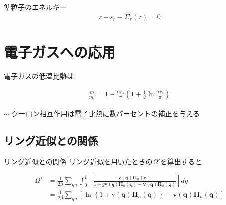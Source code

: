\documentclass[dvipdfmx,10pt]{beamer}
\begin{document}
\begin{frame}
    \begin{block}{準粒子のエネルギー}
        \begin{align*}
            z - \varepsilon_r - \Sigma_r(z)= 0 \tag{51a}
        \end{align*}
    \end{block}
\end{frame}

\section{電子ガスへの応用}
\begin{frame}
    電子ガスの低温比熱は
    \begin{block}{}
        \begin{align*}
            \frac{m}{m_t} = 1 - \frac{\alpha r_s}{\pi}\left(1 + \frac{1}{2}\ln{\frac{\alpha r_s}{\pi}}\right) \tag{67}
        \end{align*}
    \end{block}
    $\cdots$ クーロン相互作用は電子比熱に数パーセントの補正を与える
\end{frame}

\subsection{リング近似との関係}
\begin{frame}{リング近似との関係}
    リング近似を用いたときの$\Omega'$を算出すると
    \begin{block}{}
        \begin{align*}
            \Omega' &= \frac{1}{2\beta}\sum_{qn}\int_0^1\left[\frac{\bm{v}(\bm{q})\bm{\Pi}_n(\bm{q})}{1+g\bm{v}(\bm{q})\bm{\Pi}_n(\bm{q})-\bm{v}(\bm{q})\bm{\Pi}_n(\bm{q})}\right]dg \\
            &= \frac{1}{2\beta}\sum_{qn}\left[\ln\left\{1 +\bm{v}(\bm{q})\bm{\Pi}_n(\bm{q}) \right\}-\bm{v}(\bm{q})\bm{\Pi}_n(\bm{q})\right] \tag{71}
        \end{align*}
    \end{block}
\end{frame}
\end{document}
